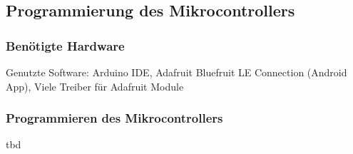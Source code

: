 \subsection{Programmierung des Mikrocontrollers}
\label{kapitel_programmierungMikrocontroller}

\subsubsection{Benötigte Hardware} 
Genutzte Software: Arduino IDE, Adafruit Bluefruit LE Connection (Android App), Viele Treiber für Adafruit Module


\subsubsection{Programmieren des Mikrocontrollers}
tbd
